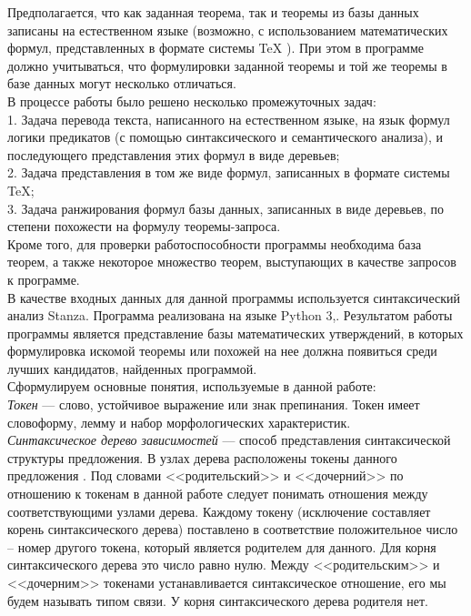 \documentclass[12pt]{article}
\begin{document}
Предполагается, что как заданная теорема, так и теоремы из базы данных записаны на естественном языке (возможно, с использованием математических формул, представленных в формате системы TeX \cite{tex}). При этом в программе должно
учитываться, что формулировки заданной теоремы и той же теоремы в базе данных могут несколько отличаться.  \\

В процессе работы  было решено несколько промежуточных задач: \\

1. Задача перевода текста, написанного на естественном языке, на язык формул логики предикатов (с помощью синтаксического и семантического анализа), и последующего представления этих формул в виде деревьев; \\

2. Задача представления в том же виде формул, записанных в формате системы TeX; \\

3. Задача ранжирования формул базы данных, записанных в виде деревьев, по степени похожести  на  формулу  теоремы-запроса.  \\

Кроме того,  для  проверки работоспособности программы необходима база теорем, а также некоторое множество теорем, выступающих в качестве запросов к программе.\\

В качестве входных данных для данной программы используется синтаксический анализ Stanza. Программа реализована на языке Python 3\cite{python},\cite{pythonsite}. Результатом работы программы является представление базы математических утверждений, в которых формулировка искомой теоремы или похожей на нее должна появиться среди лучших кандидатов, найденных программой.\\

\newpage
Сформулируем основные понятия, используемые в данной работе: \\

\textit{Токен} —  слово, устойчивое выражение или знак препинания. Токен имеет словоформу, лемму и набор морфологических характеристик. \\

\textit{Синтаксическое дерево зависимостей} --- способ представления синтаксической структуры предложения. В узлах дерева расположены токены данного предложения \cite{Bolshakova}. Под словами <<родительский>> и <<дочерний>> по отношению к токенам в данной работе следует понимать отношения между соответствующими узлами дерева. Каждому токену (исключение составляет корень синтаксического дерева) поставлено в соответствие положительное число -- номер другого токена, который является родителем для данного. Для корня синтаксического дерева это число равно нулю. Между <<родительским>> и <<дочерним>> токенами устанавливается синтаксическое отношение, его мы будем называть типом связи. У корня синтаксического дерева родителя нет.\\
\end{document}
